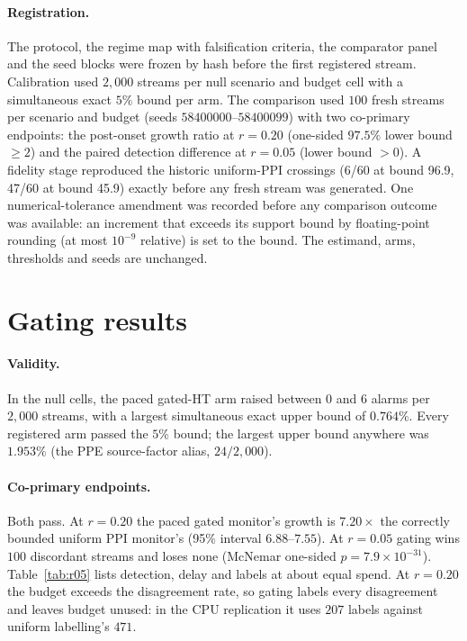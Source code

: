 \paragraph{Registration.}
The protocol, the regime map with falsification criteria, the comparator panel and the seed blocks were frozen by hash before the first registered stream.
Calibration used $2{,}000$ streams per null scenario and budget cell with a simultaneous exact $5\%$ bound per arm.
The comparison used $100$ fresh streams per scenario and budget (seeds $58400000$--$58400099$) with two co-primary endpoints:
the post-onset growth ratio at $r=0.20$ (one-sided $97.5\%$ lower bound $\ge2$) and the paired detection difference at $r=0.05$ (lower bound $>0$).
A fidelity stage reproduced the historic uniform-PPI crossings (6/60 at bound 96.9, 47/60 at bound 45.9) exactly before any fresh stream was generated.
One numerical-tolerance amendment was recorded before any comparison outcome was available: an increment that exceeds its support bound
by floating-point rounding (at most $10^{-9}$ relative) is set to the bound. The estimand, arms, thresholds and seeds are unchanged.

\section{Gating results}\label{sec:gating}

\paragraph{Validity.}
In the null cells, the paced gated-HT arm raised between $0$ and $6$ alarms per $2{,}000$ streams, with a largest simultaneous exact upper bound of $0.764\%$.
Every registered arm passed the $5\%$ bound; the largest upper bound anywhere was $1.953\%$ (the PPE source-factor alias, $24/2{,}000$).

\paragraph{Co-primary endpoints.}
Both pass. At $r=0.20$ the paced gated monitor's growth is $7.20\times$ the correctly bounded uniform PPI monitor's (95\% interval $6.88$--$7.55$).
At $r=0.05$ gating wins $100$ discordant streams and loses none (McNemar one-sided $p=7.9\times10^{-31}$).
Table~\ref{tab:r05} lists detection, delay and labels at about equal spend.
At $r=0.20$ the budget exceeds the disagreement rate, so gating labels every disagreement and leaves budget unused: in the CPU replication it uses $207$ labels against uniform labelling's $471$.


